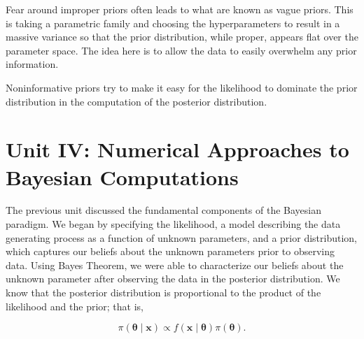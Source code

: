 \documentclass[
  letterpaper,
  DIV=11,
  numbers=noendperiod]{scrreprt}
\theoremstyle{definition}
\theoremstyle{definition}
\theoremstyle{plain}
\theoremstyle{remark}
\begin{document}
Fear around improper priors often leads to what are known as vague
priors. This is taking a parametric family and choosing the
hyperparameters to result in a massive variance so that the prior
distribution, while proper, appears flat over the parameter space. The
idea here is to allow the data to easily overwhelm any prior
information.

\begin{tcolorbox}[enhanced jigsaw, leftrule=.75mm, coltitle=black, left=2mm, title=\textcolor{quarto-callout-tip-color}{\faLightbulb}\hspace{0.5em}{Big Idea}, breakable, toptitle=1mm, bottomtitle=1mm, colback=white, colbacktitle=quarto-callout-tip-color!10!white, titlerule=0mm, opacitybacktitle=0.6, colframe=quarto-callout-tip-color-frame, bottomrule=.15mm, arc=.35mm, opacityback=0, rightrule=.15mm, toprule=.15mm]

Noninformative priors try to make it easy for the likelihood to dominate
the prior distribution in the computation of the posterior distribution.

\end{tcolorbox}

\part{Unit IV: Numerical Approaches to Bayesian Computations}

\providecommand{\norm}[1]{\lVert#1\rVert}
\providecommand{\abs}[1]{\lvert#1\rvert}
\providecommand{\iid}{\stackrel{\text{IID}}{\sim}}
\providecommand{\ind}{\stackrel{\text{Ind}}{\sim}}

\providecommand{\bm}[1]{\mathbf{#1}}
\providecommand{\bs}[1]{\boldsymbol{#1}}
\providecommand{\bbeta}{\bs{\beta}}

\providecommand{\Ell}{\mathcal{L}}
\providecommand{\indep}{\perp\negthickspace\negmedspace\perp}

The previous unit discussed the fundamental components of the Bayesian
paradigm. We began by specifying the likelihood, a model describing the
data generating process as a function of unknown parameters, and a prior
distribution, which captures our beliefs about the unknown parameters
prior to observing data. Using Bayes Theorem, we were able to
characterize our beliefs about the unknown parameter after observing the
data in the posterior distribution. We know that the posterior
distribution is proportional to the product of the likelihood and the
prior; that is,

\[\pi(\boldsymbol{\theta} \mid \mathbf{x}) \propto f(\mathbf{x} \mid \boldsymbol{\theta}) \pi(\boldsymbol{\theta}).\]
\end{document}
